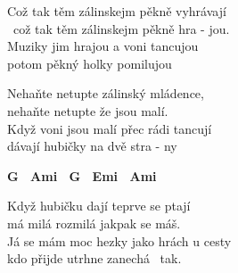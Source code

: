 
\cho{}
Což tak těm zálinskejm pěkně vyhrávají\\\
což tak těm zálinskejm pěkně hra - jou.\\
Muziky jim hrajou a voni tancujou\\
potom pěkný holky pomilujou

\ve{}
Nehaňte netupte zálinský mládence,\\
nehaňte netupte že jsou malí.\\
Když voni jsou malí přec rádi tancují\\
dávají hubičky na dvě stra - ny

{\footnotesize \textbf{G \ Ami \ G \ Emi \ Ami}}

\ve{}
Když hubičku dají teprve se ptají\\
má milá rozmilá jakpak se máš.\\
Já se mám moc hezky jako hrách u cesty\\
kdo přijde utrhne zanechá \ tak.

\cho{}

\esong{}